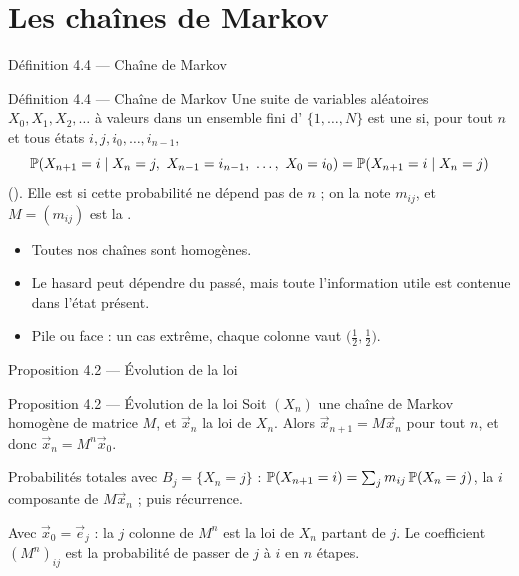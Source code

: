 \section{Les chaînes de Markov}

\begin{frame}{Définition 4.4 --- Chaîne de Markov}
  \begin{Enonce}{Définition 4.4 --- Chaîne de Markov}
    \small Une suite de variables aléatoires $X_0,X_1,X_2,\dots$ à
    valeurs dans un ensemble fini d' $\{1,\dots,N\}$ est une
     si, pour tout $n$ et tous états
    $i,j,i_0,\dots,i_{n-1}$,
    \[
      \P{X_{n+1}=i\mid X_n=j,\ X_{n-1}=i_{n-1},\ \dots,\ X_0=i_0}
      = \P{X_{n+1}=i\mid X_n=j}
    \]
    (). Elle est  si cette
    probabilité ne dépend pas de $n$ ; on la note $m_{ij}$, et
    $M=(m_{ij})$ est la .
  \end{Enonce}
  \small
  \begin{itemize}
    \item Toutes nos chaînes sont homogènes.
    \item Le hasard peut dépendre du passé, mais toute l'information utile
      est contenue dans l'état présent.
    \item Pile ou face : un cas extrême, chaque colonne vaut
      $\big(\tfrac12,\tfrac12\big)$.
  \end{itemize}
\end{frame}

\begin{frame}{Proposition 4.2 --- Évolution de la loi}
  \begin{Enonce}{Proposition 4.2 --- Évolution de la loi}
    Soit $(X_n)$ une chaîne de Markov homogène de matrice $M$, et
    $\vec x_n$ la loi de $X_n$. Alors $\vec x_{n+1}=M\vec x_n$ pour tout
    $n$, et donc $\vec x_n=M^n\vec x_0$.
  \end{Enonce}
  \begin{AuTableau}
    \small Probabilités totales avec $B_j=\{X_n=j\}$ :
    $\P{X_{n+1}=i}=\sum_j m_{ij}\,\P{X_n=j}$, la $i$ composante de
    $M\vec x_n$ ; puis récurrence.
  \end{AuTableau}
  \small Avec $\vec x_0=\vec e_j$ : la $j$ colonne de $M^n$ est la
  loi de $X_n$ partant de $j$. Le coefficient $(M^n)_{ij}$ est la
  probabilité de passer de $j$ à $i$ en $n$ étapes.
\end{frame}

